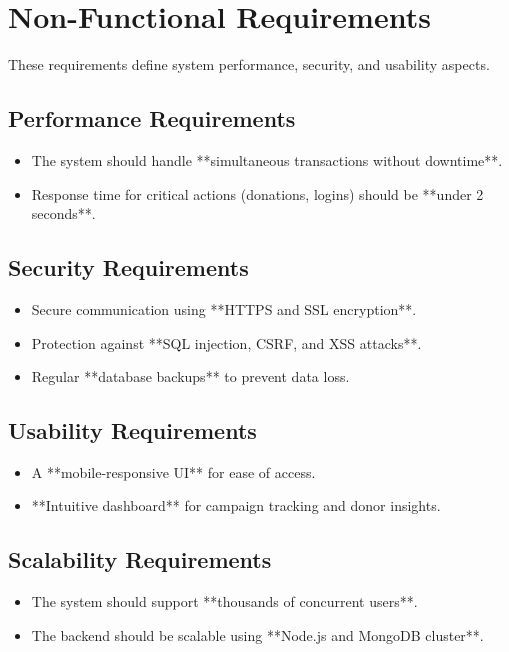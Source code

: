 \section{Non-Functional Requirements}
These requirements define system performance, security, and usability aspects.

\subsection{Performance Requirements}
\begin{itemize}
    \item The system should handle **simultaneous transactions without downtime**.
    \item Response time for critical actions (donations, logins) should be **under 2 seconds**.
\end{itemize}

\subsection{Security Requirements}
\begin{itemize}
    \item Secure communication using **HTTPS and SSL encryption**.
    \item Protection against **SQL injection, CSRF, and XSS attacks**.
    \item Regular **database backups** to prevent data loss.
\end{itemize}

\subsection{Usability Requirements}
\begin{itemize}
    \item A **mobile-responsive UI** for ease of access.
    \item **Intuitive dashboard** for campaign tracking and donor insights.
\end{itemize}

\subsection{Scalability Requirements}
\begin{itemize}
    \item The system should support **thousands of concurrent users**.
    \item The backend should be scalable using **Node.js and MongoDB cluster**.
\end{itemize}


